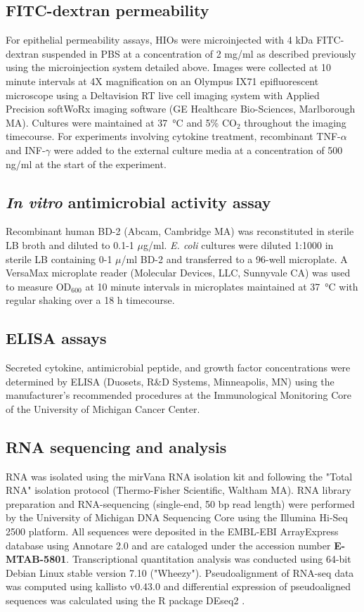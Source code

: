 \documentclass[9pt,lineo]{elife}
\begin{document}
\subsection*{{\bfseries\sffamily } FITC-dextran permeability}
\label{sec:orgheadline22}
For epithelial permeability assays, HIOs were microinjected with 4 kDa FITC-dextran suspended in PBS at a concentration of 2 mg/ml as described previously \citep{Leslie:2015} using the microinjection system detailed above. Images were collected at 10 minute intervals at 4X magnification on an Olympus IX71 epifluorescent microscope using a Deltavision RT live cell imaging system with Applied Precision softWoRx imaging software (GE Healthcare Bio-Sciences, Marlborough MA). Cultures were maintained at \SI{37}{\celsius} and 5\% CO\(_{\text{2}}\) throughout the imaging timecourse. For experiments involving cytokine treatment, recombinant TNF-\(\alpha\) and INF-\(\gamma\) were added to the external culture media at a concentration of 500 ng/ml at the start of the experiment.
\subsection*{{\bfseries\sffamily } \emph{In vitro} antimicrobial activity assay}
\label{sec:orgheadline23}
Recombinant human BD-2 (Abcam, Cambridge MA) was reconstituted in sterile LB broth and diluted to 0.1-1 \(\mu\)g/ml. \emph{E. coli} cultures were diluted 1:1000 in sterile LB containing 0-1 \(\mu\)/ml BD-2 and transferred to a 96-well microplate. A VersaMax microplate reader (Molecular Devices, LLC, Sunnyvale CA) was used to measure OD\(_{\text{600}}\) at 10 minute intervals in microplates maintained at \SI{37}{\celsius} with regular shaking  over a 18 h timecourse.
\subsection*{{\bfseries\sffamily } ELISA assays}
\label{sec:orgheadline24}
Secreted cytokine, antimicrobial peptide, and growth factor concentrations were determined by ELISA (Duosets, R\&D Systems, Minneapolis, MN) using the manufacturer's recommended procedures at the Immunological Monitoring Core of the University of Michigan Cancer Center.
\subsection*{{\bfseries\sffamily } RNA sequencing and analysis}
\label{sec:orgheadline25}
RNA was isolated using the mirVana RNA isolation kit and following the "Total RNA" isolation protocol (Thermo-Fisher Scientific, Waltham MA). RNA library preparation and RNA-sequencing (single-end, 50 bp read length) were performed by the University of Michigan DNA Sequencing Core using the Illumina Hi-Seq 2500 platform. All sequences were deposited in the EMBL-EBI ArrayExpress database using Annotare 2.0 and are cataloged under the accession number \textbf{E-MTAB-5801}. Transcriptional quantitation analysis was conducted using 64-bit Debian Linux stable version 7.10 ("Wheezy"). Pseudoalignment of RNA-seq data was computed using kallisto v0.43.0 \citep{Bray:2016} and differential expression of pseudoaligned sequences was calculated using the R package DEseq2 \citep{Love:2014}.
\end{document}
